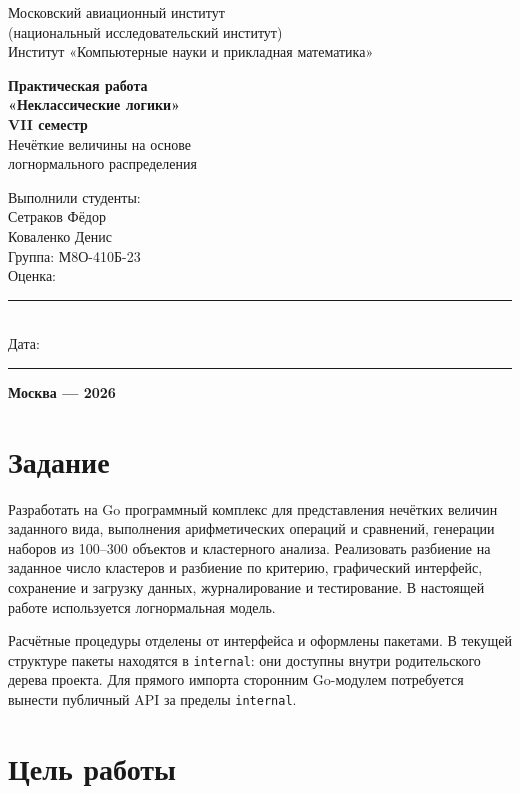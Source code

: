 \documentclass[fontsize=14pt,a4paper]{scrartcl}
\begin{document}
\begin{titlepage}
\thispagestyle{empty}
\begin{center}
Московский авиационный институт\\
(национальный исследовательский институт)\\[1.5\baselineskip]
Институт «Компьютерные науки и прикладная математика»
\vspace{30mm}

\textbf{Практическая работа}\\
\textbf{«Неклассические логики»}\\
\textbf{VII семестр}\\[1.5\baselineskip]
Нечёткие величины на основе\\логнормального распределения
\end{center}
\vfill
\begin{flushright}
Выполнили студенты:\\
Сетраков Фёдор\\
Коваленко Денис\\
Группа: М8О-410Б-23\\[5mm]
Оценка: \rule{35mm}{0.2pt}\\[3mm]
Дата: \rule{35mm}{0.2pt}
\end{flushright}
\vfill
\begin{center}\textbf{Москва — 2026}\end{center}
\end{titlepage}
\tableofcontents
\clearpage
\section*{Задание}
Разработать на Go программный комплекс для представления нечётких величин заданного вида, выполнения арифметических операций и сравнений, генерации наборов из 100--300 объектов и кластерного анализа. Реализовать разбиение на заданное число кластеров и разбиение по критерию, графический интерфейс, сохранение и загрузку данных, журналирование и тестирование. В настоящей работе используется логнормальная модель.

Расчётные процедуры отделены от интерфейса и оформлены пакетами. В текущей структуре пакеты находятся в \texttt{internal}: они доступны внутри родительского дерева проекта. Для прямого импорта сторонним Go-модулем потребуется вынести публичный API за пределы \texttt{internal}.

\section{Цель работы}
\end{document}
